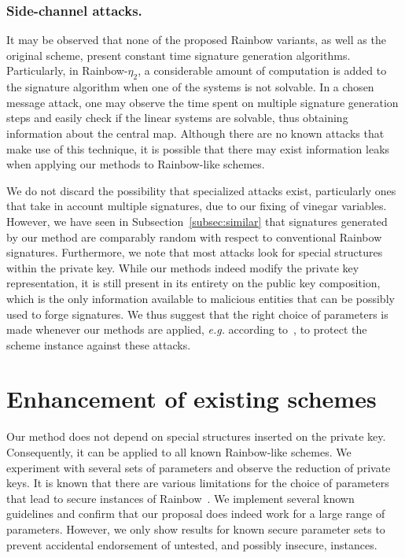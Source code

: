 \documentclass[draft, 12pt, a4paper, oneside]{memoir}
\theoremstyle{definition}
\begin{document}
\subsubsection{Side-channel attacks.} It may be observed that none of the
proposed Rainbow variants, as well as the original scheme, present constant
time signature generation algorithms. Particularly, in Rainbow-$\eta_2$, a
considerable amount of computation is added to the signature algorithm when one
of the systems is not solvable. In a chosen message attack, one may observe the
time spent on multiple signature generation steps and easily check if the
linear systems are solvable, thus obtaining information about the central map.
Although there are no known attacks that make use of this technique, it is
possible that there may exist information leaks when applying our methods to
Rainbow-like schemes.

We do not discard the possibility that specialized attacks exist,
particularly ones that take in account multiple signatures, due to our fixing
of vinegar variables. However, we have seen in Subsection~\ref{subsec:similar}
that signatures generated by our method are comparably random with respect to
conventional Rainbow signatures. Furthermore, we note that most attacks look
for special structures within the private key. While our methods indeed modify
the private key representation, it is still present in its entirety on the
public key composition, which is the only information available to malicious
entities that can be possibly used to forge signatures. We thus suggest that
the right choice of parameters is made whenever our methods are applied,
\emph{e.g.} according to~\cite{Petzoldt:201005}, to protect the scheme
instance against these attacks.

\section{Enhancement of existing schemes}\label{sec:experiments}

Our method does not depend on special structures inserted on the private key.
Consequently, it can be applied to all known Rainbow-like schemes. We
experiment with several sets of parameters and observe the reduction of private
keys. It is known that there are various limitations for the choice of
parameters that lead to secure instances of
Rainbow~\cite{Petzoldt:201005}. We implement several known guidelines
and confirm that our proposal does indeed work for a large range of parameters.
However, we only show results for known secure parameter sets to prevent
accidental endorsement of untested, and possibly insecure, instances.
\end{document}
